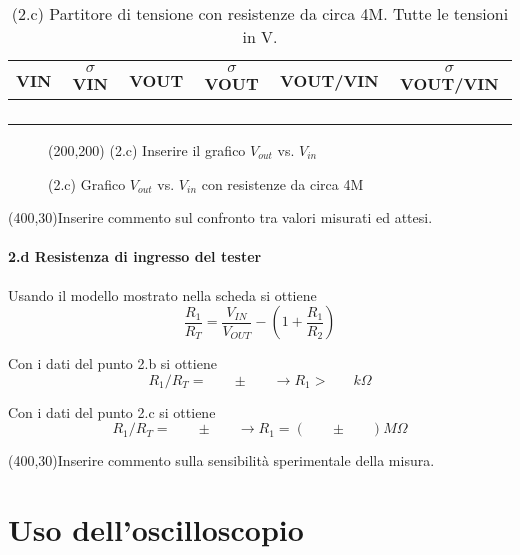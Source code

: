 \documentclass[10pt,a4paper]{article}
\newcommand{\exn}{\phantom{xxx}}
\begin{document}
\begin{table}[h]
\centering
\begin{tabular}{|c|c|c|c|c|c|}
\hline 
VIN& $\sigma$ VIN  &VOUT	 & $\sigma$ VOUT& VOUT/VIN & $\sigma$ VOUT/VIN \\
\hline 
\exn & \exn & \exn & \exn & \exn &\exn \\
\exn & \exn & \exn & \exn & \exn &\exn \\
\exn & \exn & \exn & \exn & \exn &\exn \\
\exn & \exn & \exn & \exn & \exn &\exn \\
\hline 
\end{tabular} 
\caption{(2.c) Partitore di tensione con resistenze da circa 4M. Tutte le tensioni in V.\label{t:par2}}
\end{table}


\begin{figure}[h]
\centering
\framebox(200,200){ (2.c) Inserire il grafico $V_{out}$ vs. $V_{in}$ }

\caption{(2.c) Grafico $V_{out}$ vs. $V_{in}$ con resistenze da circa 4M \label{f:par2}}
\end{figure}

\framebox(400,30){Inserire commento sul confronto tra valori misurati ed attesi.}



\paragraph{2.d Resistenza di ingresso del tester}
Usando il modello mostrato nella scheda si ottiene
\[ \frac{R_1}{R_T} =  \frac{V_{IN}}{V_{OUT}} - (1 +  \frac{R_1}{R_2} )
\]

Con i dati del punto 2.b si ottiene
\[ R_1/R_T = \exn  \pm  \exn   \rightarrow  R_1 > \exn k\Omega
\]


Con i dati del punto 2.c si ottiene
\[ R_1/R_T = \exn  \pm  \exn   \rightarrow  R_1 = (\exn \pm  \exn)  M\Omega
\]


\framebox(400,30){Inserire commento sulla sensibilit\`a sperimentale della misura.} 


\section{Uso dell'oscilloscopio}
\end{document}
